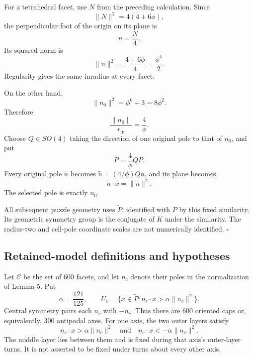 \documentclass[
  10pt,
  a4paper,
]{article}
\begin{document}
For a tetrahedral facet, use \(N\) from the preceding calculation. Since
\begin{equation}
\|N\|^2=4(4+6\phi),
\end{equation} the perpendicular foot of the origin on its plane is
\begin{equation}
n=\frac{N}{4}.
\end{equation} Its squared norm is \begin{equation}
\|n\|^2=\frac{4+6\phi}{4}
=\frac{\phi^4}{2}.
\end{equation} Regularity gives the same inradius at every facet.

On the other hand, \begin{equation}
\|n_0\|^2=\phi^6+3=8\phi^2.
\end{equation} Therefore \begin{equation}
\frac{\|n_0\|}{r_{\mathrm{in}}}=\frac4\phi.
\end{equation} Choose \(Q\in SO(4)\) taking the direction of one
original pole to that of \(n_0\), and put \begin{equation}
\widetilde P=\frac4\phi QP.
\end{equation} Every original pole \(n\) becomes
\(\widetilde n=(4/\phi)Qn\), and its plane becomes \begin{equation}
\widetilde n\cdot x=\|\widetilde n\|^2.
\end{equation} The selected pole is exactly \(n_0\).

All subsequent puzzle geometry uses \(\widetilde P\), identified with
\(P\) by this fixed similarity. Its geometric symmetry group is the
conjugate of \(K\) under the similarity. The radius-two and cell-pole
coordinate scales are not numerically identified. \(\square\)

\subsection{Retained-model definitions and
hypotheses}\label{retained-model-definitions-and-hypotheses}

Let \(\mathcal C\) be the set of \(600\) facets, and let \(n_c\) denote
their poles in the normalization of Lemma 5. Put \begin{equation}
\alpha=\frac{121}{125},
\qquad
U_c=\{x\in\widetilde P:n_c\cdot x>\alpha\|n_c\|^2\}.
\end{equation} Central symmetry pairs each \(n_c\) with \(-n_c\). Thus
there are \(600\) oriented caps or, equivalently, \(300\) antipodal
axes. For one axis, the two outer layers satisfy \begin{equation}
n_c\cdot x>\alpha\|n_c\|^2
\quad\text{and}\quad
n_c\cdot x<-\alpha\|n_c\|^2.
\end{equation} The middle layer lies between them and is fixed during
that axis's outer-layer turns. It is not asserted to be fixed under
turns about every other axis.
\end{document}
